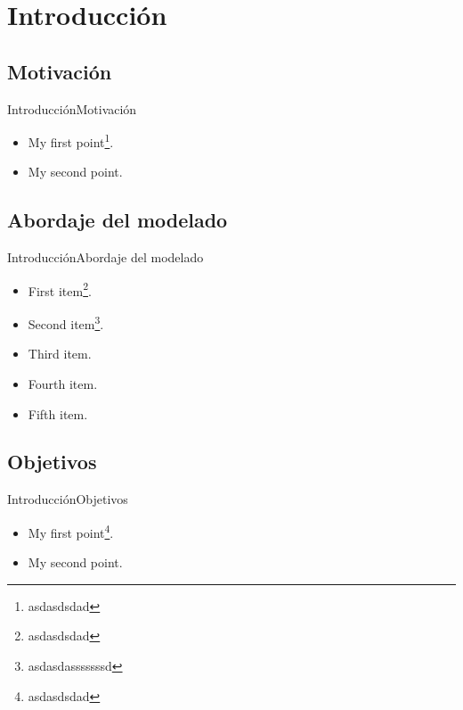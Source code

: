 \section{Introducción}

\subsection{Motivación}

\begin{frame}{Introducción}{Motivación}
  \begin{itemize}
  \item {
    My first point\footnote{asdasdsdad}.
  }
  \item {
    My second point.
  }
  \end{itemize}
\end{frame}

\subsection{Abordaje del modelado}

\begin{frame}{Introducción}{Abordaje del modelado}
  \begin{itemize}
  \item {
    First item\footnote{asdasdsdad}.
    \pause %
  }
  \item {   
    Second item\footnote{asdasdasssssssd}.
  }
  \item<3-> {
    Third item.
  }
  \item<4-> {
    Fourth item.
  }
  \item<5-> {
    Fifth item. 
  }
  \end{itemize}
\end{frame}

\subsection{Objetivos}

\begin{frame}{Introducción}{Objetivos}
  \begin{itemize}
  \item {
    My first point\footnote{asdasdsdad}.
  }
  \item {
    My second point.
  }
  \end{itemize}
\end{frame}